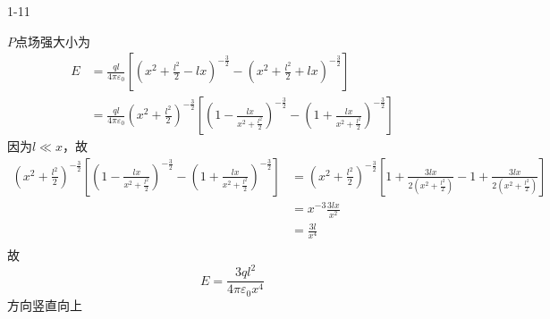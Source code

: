 \documentclass{phyasgn}
\begin{document}
{\heiti\color{red} 1-11}
\begin{sol}
  $P$点场强大小为
  $$\begin{aligned}
    E&=\frac{ql}{4\pi\varepsilon_0}\left [(x^2+\frac{l^2}{2}-lx)^{-\frac{3}{2}}-(x^2+\frac{l^2}{2}+lx)^{-\frac{3}{2}}\right ]\\
    &=\frac{ql}{4\pi\varepsilon_0}(x^2+\frac{l^2}{2})^{-\frac{3}{2}}\left[(1-\frac{lx}{x^2+\frac{l^2}{2}})^{-\frac{3}{2}}-(1+\frac{lx}{x^2+\frac{l^2}{2}})^{-\frac{3}{2}}\right]
  \end{aligned}$$
  因为$l\ll x$，故
  $$\begin{aligned}
    (x^2+\frac{l^2}{2})^{-\frac{3}{2}}\left[(1-\frac{lx}{x^2+\frac{l^2}{2}})^{-\frac{3}{2}}-(1+\frac{lx}{x^2+\frac{l^2}{2}})^{-\frac{3}{2}}\right]&=
    (x^2+\frac{l^2}{2})^{-\frac{3}{2}}\left [1+\frac{3lx}{2(x^2+\frac{l^2}{2})}-1+\frac{3lx}{2(x^2+\frac{l^2}{2})}\right ]\\
    &=x^{-3}\frac{3lx}{x^2}\\
    &=\frac{3l}{x^4}\\
  \end{aligned}$$
  故$$
E=\frac{3ql^2}{4\pi\varepsilon_0x^4}
  $$
  方向竖直向上
\end{sol}
\end{document}
